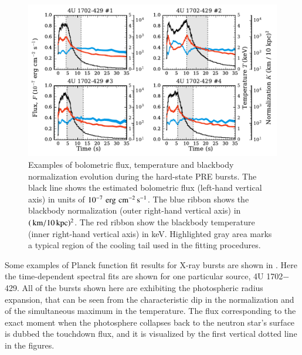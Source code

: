 \begin{figure}[t!]
\centering
\includegraphics[width=16cm]{figs/constraints/bursts.pdf}
\caption{\label{fig:bursts}
Examples of bolometric flux, temperature and blackbody normalization evolution during the hard-state PRE bursts. 
The black line shows the estimated bolometric flux (left-hand vertical axis) in units of $10^{-7} \,\, \mathrm{erg}\,\, \mathrm{cm}^{-2}\,\mathrm{s}^{-1}$.
The blue ribbon shows the blackbody normalization (outer right-hand vertical axis) in $(\, \mathrm{km}/10\,\mathrm{kpc})^2$.  
The red ribbon show the blackbody temperature (inner right-hand vertical axis) in keV. 
Highlighted gray area marks a typical region of the cooling tail used in the fitting procedures.
}
\end{figure}

Some examples of Planck function fit results for X-ray bursts are shown in .
Here the time-dependent spectral fits are shown for one particular source, 4U 1702$-$429.\cite[see][for more detailed description of the data]{NSK16, NMS17}
All of the bursts shown here are exhibiting the photospheric radius expansion, that can be seen from the characteristic dip in the normalization and of the simultaneous maximum in the temperature.\cite[see e.g.,][]{GMH08}
The flux corresponding to the exact moment when the photosphere collapses back to the neutron star's surface is dubbed the touchdown flux, and it is visualized by the first vertical dotted line in the figures.


